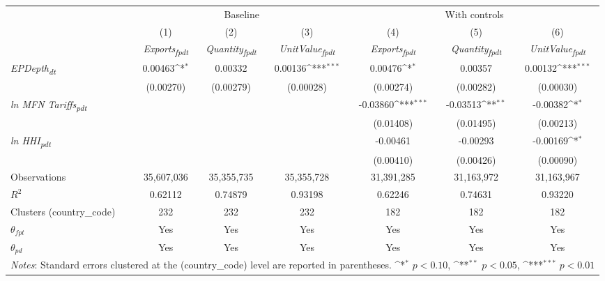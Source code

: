 {
\def\sym#1{\ifmmode^{#1}\else\(^{#1}\)\fi}
\begin{tabular}{l*{6}{c}}
\toprule
&\multicolumn{3}{c}{Baseline}&\multicolumn{3}{c}{With controls}\\\cmidrule(lr){2-4}\cmidrule(lr){5-7}
&(1)&(2)&(3)&(4)&(5)&(6)\\
&\textit{Exports\textsubscript{fpdt}}&\textit{Quantity\textsubscript{fpdt}}&\textit{UnitValue\textsubscript{fpdt}}&\textit{Exports\textsubscript{fpdt}}&\textit{Quantity\textsubscript{fpdt}}&\textit{UnitValue\textsubscript{fpdt}}\\
\midrule
\textit{EPDepth\textsubscript{dt}} & 0.00463\sym{*} & 0.00332 & 0.00136\sym{***} & 0.00476\sym{*} & 0.00357 & 0.00132\sym{***}\\
 & (0.00270) & (0.00279) & (0.00028) & (0.00274) & (0.00282) & (0.00030)\\
\addlinespace
\textit{ln MFN Tariffs\textsubscript{pdt}} &  &  &  & -0.03860\sym{***} & -0.03513\sym{**} & -0.00382\sym{*}\\
 &  &  &  & (0.01408) & (0.01495) & (0.00213)\\
\addlinespace
\textit{ln HHI\textsubscript{pdt}} &  &  &  & -0.00461 & -0.00293 & -0.00169\sym{*}\\
 &  &  &  & (0.00410) & (0.00426) & (0.00090)\\
\midrule
Observations & 35,607,036 & 35,355,735 & 35,355,728 & 31,391,285 & 31,163,972 & 31,163,967\\
$R^{2}$ & 0.62112 & 0.74879 & 0.93198 & 0.62246 & 0.74631 & 0.93220\\
Clusters (country_code) & 232 & 232 & 232 & 182 & 182 & 182\\
$\theta_{fpt}$ & Yes & Yes & Yes & Yes & Yes & Yes\\
$\theta_{pd}$ & Yes & Yes & Yes & Yes & Yes & Yes\\
\bottomrule
\multicolumn{7}{l}{\footnotesize \textit{Notes}: Standard errors clustered at the (country_code) level are reported in parentheses. \sym{*} \(p<0.10\), \sym{**} \(p<0.05\), \sym{***} \(p<0.01\)}\\
\end{tabular}
}
